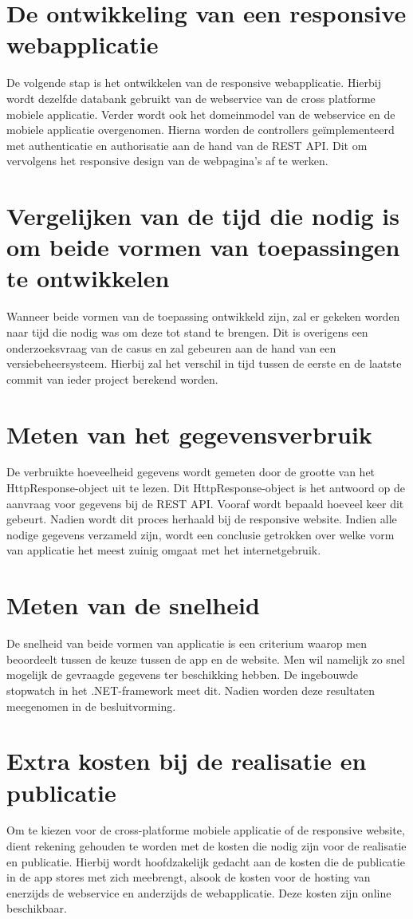 \section{De ontwikkeling van een responsive webapplicatie}
De volgende stap is het ontwikkelen van de responsive webapplicatie.
Hierbij wordt dezelfde databank gebruikt van de webservice van de cross platforme
mobiele applicatie. Verder wordt ook het domeinmodel van de webservice en de mobiele applicatie overgenomen. Hierna worden de controllers
geïmplementeerd met authenticatie en authorisatie aan de hand van de REST API.
Dit om vervolgens het responsive design van de webpagina's af te werken.

\section{Vergelijken van de tijd die nodig is om beide vormen van toepassingen te ontwikkelen}
Wanneer beide vormen van de toepassing ontwikkeld zijn, zal er gekeken worden naar tijd die nodig was om deze tot stand te brengen.
Dit is overigens een onderzoeksvraag van de casus en zal gebeuren aan de hand van een versiebeheersysteem.
Hierbij zal het verschil in tijd tussen de eerste en de laatste commit van ieder project berekend worden.

\section{Meten van het gegevensverbruik}
De verbruikte hoeveelheid gegevens wordt gemeten door de grootte van het HttpResponse-object uit te lezen.
Dit HttpResponse-object is het antwoord op de aanvraag voor gegevens bij de REST API. Vooraf wordt bepaald hoeveel keer dit gebeurt.
Nadien wordt dit proces herhaald bij de responsive website. Indien alle nodige gegevens verzameld zijn, wordt een conclusie
getrokken over welke vorm van applicatie het meest zuinig omgaat met het internetgebruik.

\section{Meten van de snelheid}
De snelheid van beide vormen van applicatie is een criterium waarop men beoordeelt tussen de keuze tussen de app en de website.
Men wil namelijk zo snel mogelijk de gevraagde gegevens ter beschikking hebben. De ingebouwde stopwatch in het .NET-framework meet
dit. Nadien worden deze resultaten meegenomen in de besluitvorming.

\section{Extra kosten bij de realisatie en publicatie}
Om te kiezen voor de cross-platforme mobiele applicatie of de responsive website, dient rekening gehouden te worden met de kosten die nodig zijn voor de realisatie en publicatie.
Hierbij wordt hoofdzakelijk gedacht aan de kosten die de publicatie in de app stores met zich meebrengt, alsook de kosten voor de hosting van enerzijds de webservice en
anderzijds de webapplicatie. Deze kosten zijn online beschikbaar.

